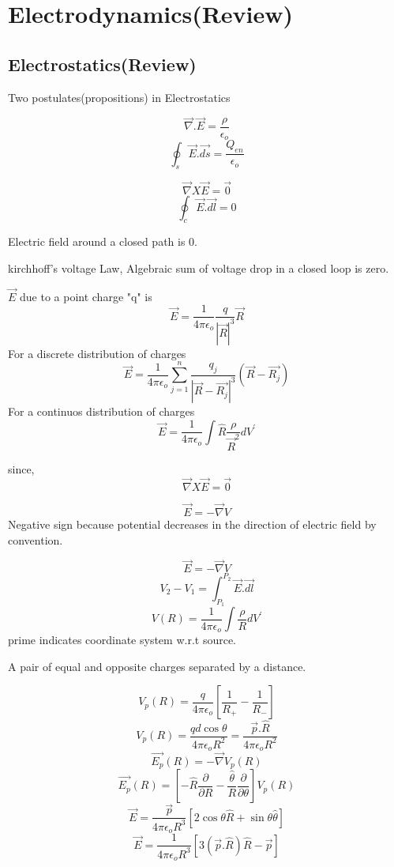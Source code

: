 \chapter{Electrodynamics(Review)}
\section{Electrostatics(Review)}
Two postulates(propositions) in Electrostatics
\begin{proposition}
	\[
		\vec{\nabla} . \vec{E} = \frac{\rho}{\epsilon_{o} }
	\]
	\[
		\oint_s {\vec{E}.\vec{ds}} = \frac{Q_{en} }{\epsilon _o}
	\]
\end{proposition}
\begin{proposition}
	\[
		\vec{\nabla} X \vec{E} = \vec{0}
	\]
	\[
		\oint_c {\vec{E}.\vec{dl}} = 0
	\]
\end{proposition}
Electric field around a closed path is 0.
\begin{theorem}
	kirchhoff's voltage Law, Algebraic sum of voltage drop in a closed loop is zero.
\end{theorem}

\begin{theorem}
\(\vec{E}\) due to a point charge "q" is 
\[
	\vec{E} = \frac{1}{4 \pi \epsilon_o} \frac{q}{\left\vert \vec{R} \right\vert ^3}\vec{R} 
\]
For a discrete distribution of charges
\[
	\vec{E} = \frac{1}{4 \pi \epsilon_o} \sum_{j=1}^{n} \frac{q_j}{\left\vert \vec{R}-\vec{R_j} \right\vert ^3}(\vec{R}-\vec{R_j})
\]
For a continuos distribution of charges
\[
	\vec{E} = \frac{1}{4 \pi \epsilon_o} \int \hat{R} \frac{\rho}{\vec{R}^2} dV^\prime 
\]
\end{theorem}

since, 
\[
	\vec{\nabla} X \vec{E} = \vec{0}
\]

\[
	\vec{E} = - \vec{\nabla}V
\]
Negative sign because potential decreases in the direction of electric field by convention.

\begin{definition}
	\[
	\vec{E} = - \vec{\nabla}V
\]	
\[
	V_2 - V_1 = \int _{P_1}^{P_2} \vec{E}.\vec{dl}
\]
\[
	V(R) = \frac{1}{4 \pi \epsilon_o} \int \frac{\rho}{R} dV^\prime  
\]
prime indicates coordinate system w.r.t source.
\end{definition}

\begin{definition}[Dipole]
	A pair of equal and opposite charges separated by a distance.
\end{definition}
\[
		V_{p} (R) = \frac{q}{4 \pi \epsilon_o}[\frac{1}{R_+}-\frac{1}{R_-}]
\]
\[		
		V_{p} (R) = \frac{q d \cos \theta}{4 \pi \epsilon_o R^2} = \frac{\vec{p}.\hat{R}}{4 \pi \epsilon_o R^2}
\]
\[
	\vec{E_{p}} (R) = -\vec{\nabla}V_{p} (R)
\]
\[
	\vec{E_{p}} (R) = [-\hat{R} \frac{\partial}{\partial R} - \frac{\hat{\theta}}{R} \frac{\partial}{\partial \theta}]V_{p}(R)
\]
\[
	\vec{E} = \frac{\vec{p}}{4 \pi \epsilon_{o} R^3 }[2 \cos \theta \hat{R} + \sin \theta \hat{\theta}]
\]
\[
	\vec{E} = \frac{1}{4 \pi \epsilon_{o} R^3 } [3 (\vec{p}.\hat{R})\hat{R} - \vec{p}]
\]
